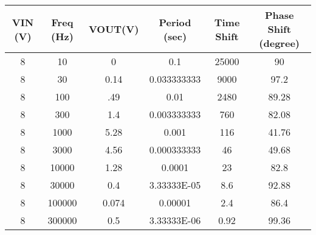 \begin{tabular}{|c|c|c|c|c|c|}
\hline
VIN (V)&Freq (Hz)&VOUT(V)&Period (sec)&Time Shift&Phase Shift (degree)\\
\hline
8&10&0&0.1&25000&90\\
\hline
8&30&0.14&0.033333333&9000&97.2\\
\hline
8&100&.49&0.01&2480&89.28\\
\hline
8&300&1.4&0.003333333&760&82.08\\
\hline
8&1000&5.28&0.001&116&41.76\\
\hline
8&3000&4.56&0.000333333&46&49.68\\
\hline
8&10000&1.28&0.0001&23&82.8\\
\hline
8&30000&0.4&3.33333E-05&8.6&92.88\\
\hline
8&100000&0.074&0.00001&2.4&86.4\\
\hline
8&300000&0.5&3.33333E-06&0.92&99.36\\
\hline
\end{tabular}
